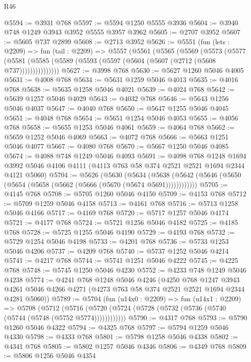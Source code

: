 \begin{lexlean}{R46}
\begin{coremodule}
@5594 := @3931 @768
@5597 := @5594 @1250 @5555 @3936
@5604 := @3940 @748 @1249 @3943 @3952 @5555 @3957 @3962
@5605 := @2707 @3952
@5607 := @5605 @737 @2899
@5608 := @2713 @3952
@5626 := @5551
    (fun (lets : @2209) =>
    fun (tail : @2209) =>
    @5557
      (@5561
        (@5565
          (@5569
            (@5573
              (@5577
                (@5581 (@5585 (@5589 (@5593 (@5597 (@5604 (@5607 (@2712 (@5608 @737)))))))))))))))
@5627 := @3998 @768
@5630 := @5627 @1260 @5046 @4005
@5631 := @4008 @768
@5634 := @5631 @1259 @5046 @4013
@5635 := @4016 @768
@5638 := @5635 @1258 @5046 @4021
@5639 := @4024 @768
@5642 := @5639 @1257 @5046 @4029
@5643 := @4032 @768
@5646 := @5643 @1256 @5046 @4037
@5647 := @4040 @768
@5650 := @5647 @1255 @5046 @4045
@5651 := @4048 @768
@5654 := @5651 @1254 @5046 @4053
@5655 := @4056 @768
@5658 := @5655 @1253 @5046 @4061
@5659 := @4064 @768
@5662 := @5659 @1252 @5046 @4069
@5663 := @4072 @768
@5666 := @5663 @1251 @5046 @4077
@5667 := @4080 @768
@5670 := @5667 @1250 @5046 @4085
@5674 := @4088 @748 @1249 @5046 @4093
@5691 := @4098
    @768
    @1248
    @1694
    @3992
    @5046
    @4106
    @4111
    (@4113 @763 @58 @374 @2521 @2521 @1694 @2344 @4121 @5060)
@5704 := @5626
    (@5630
      (@5634 (@5638 (@5642 (@5646 (@5650 (@5654 (@5658 (@5662 (@5666 (@5670 (@5674 @5691))))))))))))
@5705 := @4145 @768
@5708 := @5705 @1260 @5046 @4150
@5709 := @4153 @768
@5712 := @5709 @1259 @5046 @4158
@5713 := @4161 @768
@5716 := @5713 @1258 @5046 @4166
@5717 := @4169 @768
@5720 := @5717 @1257 @5046 @4174
@5721 := @4177 @768
@5724 := @5721 @1256 @5046 @4182
@5725 := @4185 @768
@5728 := @5725 @1255 @5046 @4190
@5729 := @4193 @768
@5732 := @5729 @1254 @5046 @4198
@5733 := @4201 @768
@5736 := @5733 @1253 @5046 @4206
@5737 := @4209 @768
@5740 := @5737 @1252 @5046 @4214
@5741 := @4217 @768
@5744 := @5741 @1251 @5046 @4222
@5745 := @4225 @768
@5748 := @5745 @1250 @5046 @4230
@5752 := @4233 @748 @1249 @5046 @4238
@5774 := @4241
    @768
    @1248
    @5046
    @4246
    (@4250
      @768
      @1247
      @3943
      @4261
      @5046
      @4266
      @4271
      (@4273 @763 @58 @374 @2521 @2521 @1694 @2344 @4281 @5060))
@5789 := @5704
    (fun (u14x0 : @2209) =>
    fun (u14x1 : @2209) =>
    @5708
      (@5712 (@5716 (@5720 (@5724 (@5728 (@5732 (@5736 (@5740 (@5744 (@5748 (@5752 @5774))))))))))))
@5790 := @4317 @768
@5793 := @5790 @1260 @5046 @4322
@5794 := @4325 @768
@5797 := @5794 @1259 @5046 @4330
@5798 := @4333 @768
@5801 := @5798 @1258 @5046 @4338
@5802 := @4341 @768
@5805 := @5802 @1257 @5046 @4346
@5806 := @4349 @768
@5809 := @5806 @1256 @5046 @4354

\end{coremodule}
\end{lexlean}
